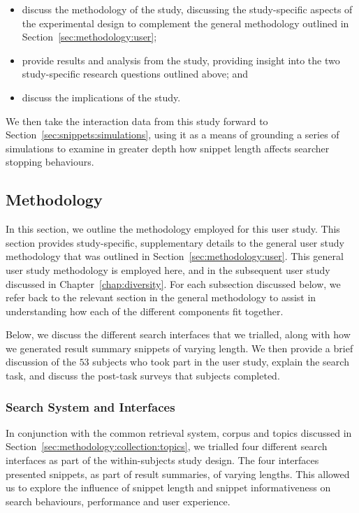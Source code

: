 \begin{itemize}
    \item{discuss the methodology of the study, discussing the study-specific aspects of the experimental design to complement the general methodology outlined in Section~\ref{sec:methodology:user};}
    \item{provide results and analysis from the study, providing insight into the two study-specific research questions outlined above; and}
    \item{discuss the implications of the study.}
\end{itemize}

We then take the interaction data from this study forward to Section~\ref{sec:snippets:simulations}, using it as a means of grounding a series of simulations to examine in greater depth how snippet length affects searcher stopping behaviours.

\subsection{Methodology}\label{sec:snippets:method}
In this section, we outline the methodology employed for this user study. This section provides study-specific, supplementary details to the general user study methodology that was outlined in Section~\ref{sec:methodology:user}. This general user study methodology is employed here, and in the subsequent user study discussed in Chapter~\ref{chap:diversity}. For each subsection discussed below, we refer back to the relevant section in the general methodology to assist in understanding how each of the different components fit together.

Below, we discuss the different search interfaces that we trialled, along with how we generated result summary snippets of varying length. We then provide a brief discussion of the $53$ subjects who took part in the user study, explain the search task, and discuss the post-task surveys that subjects completed.

\subsubsection{Search System and Interfaces}\label{sec:snippets:method:system}
In conjunction with the common retrieval system, corpus and topics discussed in Section~\ref{sec:methodology:collection:topics}, we trialled four different search interfaces as part of the within-subjects study design. The four interfaces presented snippets, as part of result summaries, of varying lengths. This allowed us to explore the influence of snippet length and snippet informativeness on search behaviours, performance and user experience.

